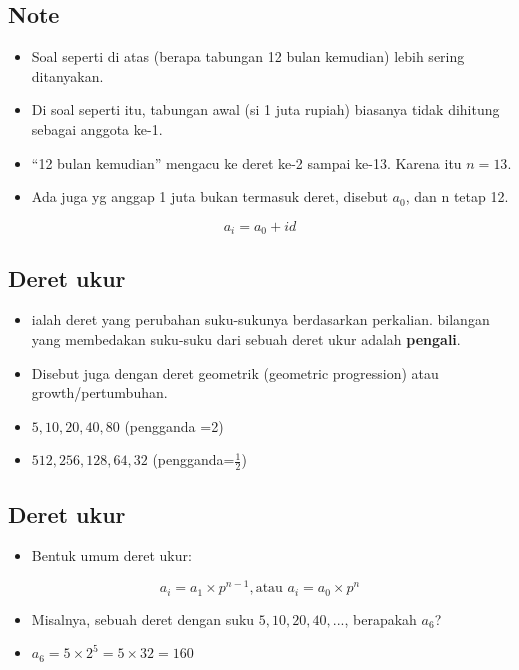 \documentclass[
  letterpaper,
  DIV=11,
  numbers=noendperiod]{scrartcl}
\providecommand{\tightlist}{%
  \setlength{\itemsep}{0pt}\setlength{\parskip}{0pt}}\usepackage{longtable,booktabs,array}
\begin{document}
\subsection{Note}\label{note-1}

\begin{itemize}
\item
  Soal seperti di atas (berapa tabungan 12 bulan kemudian) lebih sering
  ditanyakan.
\item
  Di soal seperti itu, tabungan awal (si 1 juta rupiah) biasanya tidak
  dihitung sebagai anggota ke-1.
\item
  ``12 bulan kemudian'' mengacu ke deret ke-2 sampai ke-13. Karena itu
  \(n=13\).
\item
  Ada juga yg anggap 1 juta bukan termasuk deret, disebut \(a_0\), dan n
  tetap 12.
\end{itemize}

\[
a_i=a_0+id
\]

\subsection{Deret ukur}\label{deret-ukur}

\begin{itemize}
\item
  ialah deret yang perubahan suku-sukunya berdasarkan perkalian.
  bilangan yang membedakan suku-suku dari sebuah deret ukur adalah
  \textbf{pengali}.
\item
  Disebut juga dengan deret geometrik (geometric progression) atau
  growth/pertumbuhan.
\item
  \(5,10,20,40,80\) (pengganda =2)
\item
  \(512, 256, 128,64,32\) (pengganda=\(\frac{1}{2}\))
\end{itemize}

\subsection{Deret ukur}\label{deret-ukur-1}

\begin{itemize}
\tightlist
\item
  Bentuk umum deret ukur:
\end{itemize}

\[
a_i=a_1\times p^{n-1}, \text{atau } a_i=a_0\times p^n
\]

\begin{itemize}
\item
  Misalnya, sebuah deret dengan suku \(5,10,20,40,...\), berapakah
  \(a_6\)?
\item
  \(a_6=5 \times 2^5=5 \times 32=160\)
\end{itemize}
\end{document}
